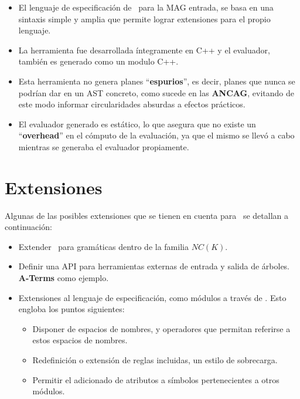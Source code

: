 \begin{itemize}
\item El lenguaje de especificación de \maggen\ para la MAG entrada, se basa en una sintaxis simple y amplia que permite lograr extensiones para el propio lenguaje.

\item La herramienta fue desarrollada íntegramente en C++ y el evaluador, también es generado como un modulo C++. 

\item Esta herramienta no genera planes ``\textbf{espurios}'', es decir, planes que nunca se podrían dar en un AST concreto, como sucede en las \textbf{ANCAG}, evitando de este modo informar circularidades absurdas a efectos prácticos.

\item El evaluador generado es estático, lo que asegura que no existe un ``\textbf{overhead}'' en el cómputo de la evaluación, ya que el mismo se llevó a cabo mientras se generaba el evaluador propiamente.
\end{itemize}

\section{Extensiones}
Algunas de las posibles extensiones que se tienen en cuenta para \maggen\ se detallan a continuación:
\begin{itemize}
\item Extender \maggen\ para gramáticas dentro de la familia $NC(K)$.

\item Definir una API para herramientas externas de entrada y salida de árboles. \textbf{A-Terms} como ejemplo.

\item Extensiones al lenguaje de especificación, como módulos a través de . Esto engloba los puntos siguientes:

\begin{itemize}
\item Disponer de espacios de nombres, y operadores que permitan referirse a estos espacios de nombres.

\item Redefinición o extensión de reglas incluidas, un estilo de sobrecarga.

\item Permitir el adicionado de atributos a símbolos pertenecientes a otros módulos.
\end{itemize}

\end{itemize}


